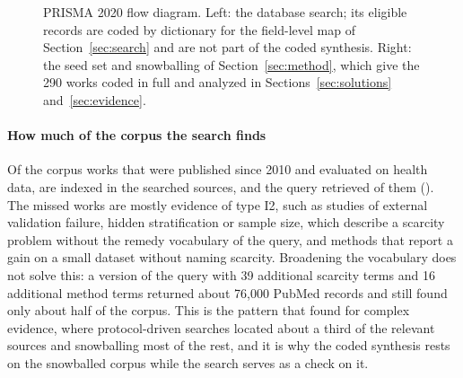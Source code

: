 \documentclass[acmsmall,screen,review]{acmart}
\theoremstyle{acmdefinition}
\begin{document}
\begin{figure}[t]
\centering

\caption{PRISMA 2020 flow diagram. Left: the database search; its eligible records are coded by dictionary for the field-level map of Section~\ref{sec:search} and are not part of the coded synthesis. Right: the seed set and snowballing of Section~\ref{sec:method}, which give the 290 works coded in full and analyzed in Sections~\ref{sec:solutions} and~\ref{sec:evidence}.}
\label{fig:prisma}
\end{figure}

\paragraph{How much of the corpus the search finds} Of the \PrismaCorpusInScope{} corpus works that were published since 2010 and evaluated on health data, \PrismaCorpusIndexed{} are indexed in the searched sources, and the query retrieved \PrismaCorpusRetrieved{} of them (\PrismaRecall). The missed works are mostly evidence of type I2, such as studies of external validation failure, hidden stratification or sample size, which describe a scarcity problem without the remedy vocabulary of the query, and methods that report a gain on a small dataset without naming scarcity. Broadening the vocabulary does not solve this: a version of the query with 39 additional scarcity terms and 16 additional method terms returned about 76{,}000 PubMed records and still found only about half of the corpus. This is the pattern that \citet{greenhalgh2005effectiveness} found for complex evidence, where protocol-driven searches located about a third of the relevant sources and snowballing most of the rest, and it is why the coded synthesis rests on the snowballed corpus while the search serves as a check on it.
\end{document}
